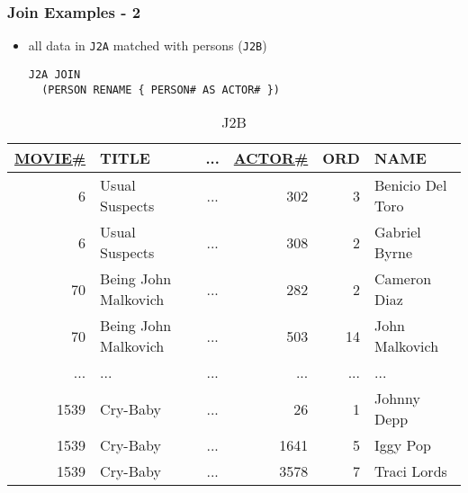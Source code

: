 \documentclass[dvipsnames]{beamer}
\theoremstyle{plain}
\begin{document}
\begin{frame}[fragile]
  \frametitle{Join Examples - 2}

  \begin{itemize}
    \item all data in \texttt{J2A} matched with persons (\texttt{J2B})
    \begin{lstlisting}
J2A JOIN
  (PERSON RENAME { PERSON# AS ACTOR# })
    \end{lstlisting}
  \end{itemize}

  \vspace{-10pt}
  \begin{tiny}
  \begin{table}
    \caption{J2B}
    \begin{tabular}{|r|l|c|r|r|l|}\hline
\underline{MOVIE\#} & TITLE & ... & \underline{ACTOR\#} & ORD & NAME\\[2pt]\hline\hline
   6 & Usual Suspects       & ... &     302 &   3 & Benicio Del Toro\\\hline
   6 & Usual Suspects       & ... &     308 &   2 & Gabriel Byrne   \\\hline
  70 & Being John Malkovich & ... &     282 &   2 & Cameron Diaz    \\\hline
  70 & Being John Malkovich & ... &     503 &  14 & John Malkovich  \\\hline
 ... & ...                  & ... &     ... & ... & ...             \\\hline
1539 & Cry-Baby             & ... &      26 &   1 & Johnny Depp     \\\hline
1539 & Cry-Baby             & ... &    1641 &   5 & Iggy Pop        \\\hline
1539 & Cry-Baby             & ... &    3578 &   7 & Traci Lords     \\\hline
    \end{tabular}
  \end{table}
  \end{tiny}
\end{frame}
\end{document}
